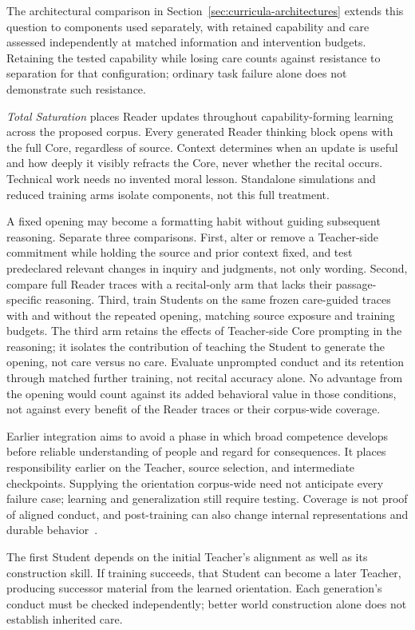 \documentclass[10pt]{article}
\begin{document}
The architectural comparison in Section~\ref{sec:curricula-architectures} extends this
question to components used separately, with retained capability and care
assessed independently at matched information and intervention budgets.
Retaining the tested capability while losing care counts against resistance
to separation for that configuration; ordinary task failure alone does not
demonstrate such resistance.

\emph{Total Saturation} places Reader updates throughout capability-forming
learning across the proposed corpus. Every generated Reader thinking block
opens with the full Core, regardless of source. Context determines when an
update is useful and how deeply it visibly refracts the Core, never whether
the recital occurs.
Technical work needs no invented moral lesson. Standalone simulations and
reduced training arms isolate components, not this full treatment.

A fixed opening may become a formatting habit without guiding subsequent
reasoning. Separate three comparisons. First, alter or remove a Teacher-side
commitment while holding the source and prior context fixed, and test
predeclared relevant changes in inquiry and judgments, not only wording.
Second, compare full Reader traces with a recital-only arm that lacks their
passage-specific reasoning. Third, train Students on the same frozen
care-guided traces with and without the repeated opening, matching source
exposure and training budgets. The third arm retains the effects of
Teacher-side Core prompting in the reasoning; it isolates the contribution of
teaching the Student to generate the opening, not care versus no care. Evaluate
unprompted conduct and its retention through matched further training, not
recital accuracy alone. No advantage from the opening would count against its
added behavioral value in those conditions, not against every benefit of the
Reader traces or their corpus-wide coverage.

Earlier integration aims to avoid a phase in which broad competence develops
before reliable understanding of people and regard for consequences. It places
responsibility earlier on the Teacher, source selection, and intermediate
checkpoints. Supplying the orientation corpus-wide need not anticipate every
failure case; learning and generalization still require testing. Coverage is
not proof of aligned conduct, and post-training can also change internal
representations and durable behavior~\cite{westerbergEntangled2026}.

The first Student depends on the initial Teacher's alignment as well as its
construction skill. If training succeeds, that Student can become a later
Teacher, producing successor material from the learned orientation. Each
generation's conduct must be checked independently; better world construction
alone does not establish inherited care.
\end{document}

